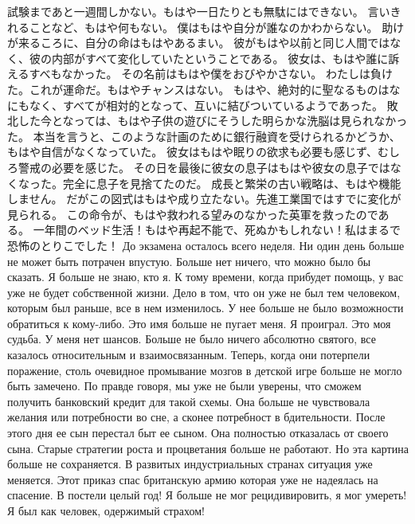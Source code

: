 試験まであと一週間しかない。もはや一日たりとも無駄にはできない。
言いきれることなど、もはや何もない。
僕はもはや自分が誰なのかわからない。
助けが来るころに、自分の命はもはやあるまい。
彼がもはや以前と同じ人間ではなく、彼の内部がすべて変化していたということである。
彼女は、もはや誰に訴えるすべもなかった。
その名前はもはや僕をおびやかさない。
わたしは負けた。これが運命だ。もはやチャンスはない。
もはや、絶対的に聖なるものはなにもなく、すべてが相対的となって、互いに結びついているようであった。
敗北した今となっては、もはや子供の遊びにそうした明らかな洗脳は見られなかった。
本当を言うと、このような計画のために銀行融資を受けられるかどうか、もはや自信がなくなっていた。
彼女はもはや眠りの欲求も必要も感じず、むしろ警戒の必要を感じた。
その日を最後に彼女の息子はもはや彼女の息子ではなくなった。完全に息子を見捨てたのだ。
成長と繁栄の古い戦略は、もはや機能しません。
だがこの図式はもはや成り立たない。先進工業国ではすでに変化が見られる。
この命令が、もはや救われる望みのなかった英軍を救ったのである。
一年間のベッド生活！もはや再起不能で、死ぬかもしれない！私はまるで恐怖のとりこでした！
До экзамена осталось всего неделя. Ни один день больше не может быть потрачен впустую.
Больше нет ничего, что можно было бы сказать.
Я больше не знаю, кто я.
К тому времени, когда прибудет помощь, у вас уже не будет собственной жизни.
Дело в том, что он уже не был тем человеком, которым был раньше, все в нем изменилось.
У нее больше не было возможности обратиться к кому-либо.
Это имя больше не пугает меня.
Я проиграл. Это моя судьба. У меня нет шансов.
Больше не было ничего абсолютно святого, все казалось относительным и взаимосвязанным.
Теперь, когда они потерпели поражение, столь очевидное промывание мозгов в детской игре больше не могло быть замечено.
По правде говоря, мы уже не были уверены, что сможем получить банковский кредит для такой схемы.
Она больше не чувствовала желания или потребности во сне, а сконее потребност в бдительности.
После этого дня ее сын перестал быт ее сыном. Она полностью отказалась от своего сына.
Старые стратегии роста и процветания больше не работают.
Но эта картина больше не сохраняется. В развитых индустриальных странах ситуация уже меняется.
Этот приказ спас британскую армию которая уже не надеялась на спасение.
В постели целый год! Я больше не мог рецидивировить, я мог умереть! Я был как человек, одержимый страхом!